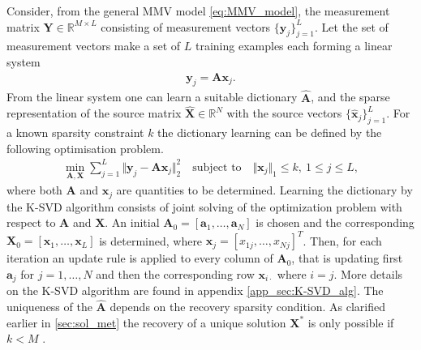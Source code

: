 Consider, from the general MMV model \eqref{eq:MMV_model}, the measurement matrix $\mathbf{Y} \in \mathbb{R}^{M \times L}$ consisting of measurement vectors $\lbrace \mathbf{y}_j \rbrace_{j=1}^L$. Let the set of measurement vectors make a set of $L$ training examples each forming a linear system
\begin{align*}
\mathbf{y}_j = \mathbf{A} \mathbf{x}_j.
\end{align*}
From the linear system one can learn a suitable dictionary $\hat{\mathbf{A}}$, and the sparse representation of the source matrix $\hat{\mathbf{X}} \in \mathbb{R}^N$ with the source vectors $\lbrace \hat{\mathbf{x}}_j \rbrace_{j=1}^L$.
For a known sparsity constraint $k$ the dictionary learning can be defined by the following optimisation problem. 
\begin{align}\label{eq:SVD1}
\min_{\mathbf{A}, \mathbf{X}} \sum_{j=1}^{L} \Vert \mathbf{y}_j - \mathbf{A} \mathbf{x}_j \Vert_2^2 \quad \text{subject to} \quad \Vert \textbf{x}_j \Vert_1 \leq k, \ 1 \leq j \leq L,
\end{align}
where both $\textbf{A}$ and $\textbf{x}_j$ are quantities to be determined.
Learning the dictionary by the K-SVD algorithm consists of joint solving of the optimization problem with respect to $\mathbf{A}$ and $\mathbf{X}$. 
An initial $\textbf{A}_0 = [\textbf{a}_1,\hdots,\textbf{a}_N]$ is chosen and the corresponding $\textbf{X}_0 = [\textbf{x}_1,\hdots,\textbf{x}_L]$ is determined, where $\textbf{x}_j=[x_{1j},\hdots,x_{Nj}]^T$. Then, for each iteration an update rule is applied to every column of $\textbf{A}_0$, that is updating first $\textbf{a}_j$ for $j=1,\hdots,N$ and then the corresponding row $\textbf{x}_{i\cdot}$ where $i=j$. 
More details on the K-SVD algorithm are found in appendix \ref{app_sec:K-SVD_alg}. 
The uniqueness of the $\hat{\mathbf{A}}$ depends on the recovery sparsity condition. As clarified earlier in \ref{sec:sol_met} the recovery of a unique solution $\mathbf{X}^\ast$ is only possible if $k < M$ \cite{phd2015}.


